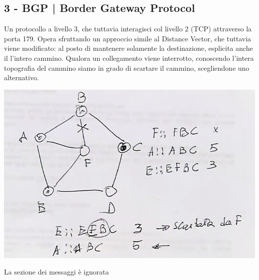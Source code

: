 \documentclass[11pt, oneside]{article}   	%
\begin{document}
\subsection*{3 - BGP | Border Gateway Protocol}
Un protocollo a livello 3, che tuttavia interagisci col livello 2 (TCP) attraverso la porta 179. Opera sfruttando un approccio simile al Distance Vector, che tuttavia viene modificato: al posto di mantenere solamente la destinazione, esplicita anche il l'intero cammino. 
Qualora un collegamento viene interrotto, conoscendo l'intera topografia del cammino siamo in grado di scartare il cammino, scegliendone uno alternativo.
\begin{center}
\includegraphics[scale=0.5]{bgp}
\end{center}
\footnotesize{La sezione dei messaggi è ignorata}
\end{document}

